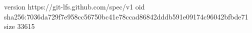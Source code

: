 version https://git-lfs.github.com/spec/v1
oid sha256:7036da729f7e958cc56750bc41e78ccad86842dddb591e09174c96042bfbde71
size 33615
